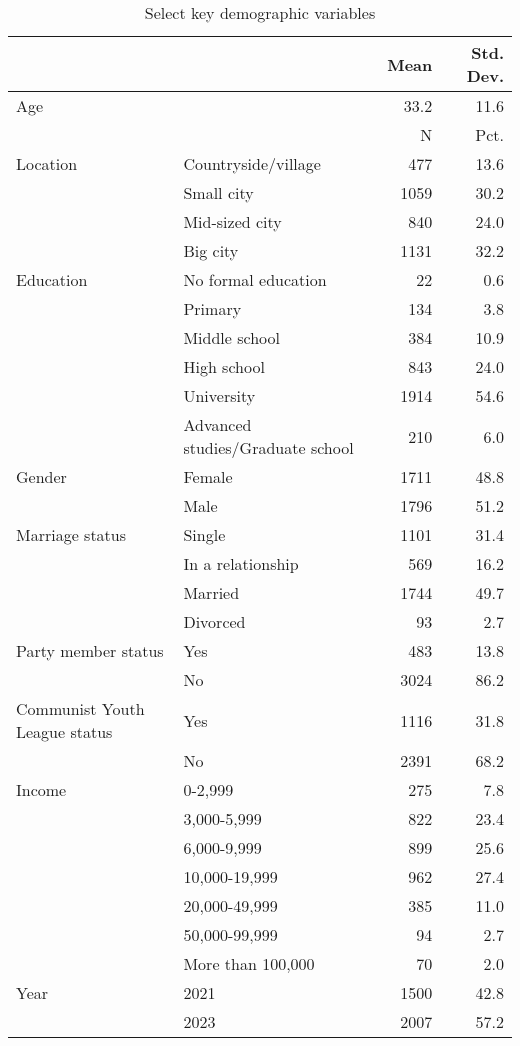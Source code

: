 \documentclass[
  letterpaper,
  DIV=11,
  numbers=noendperiod]{scrartcl}
\begin{document}
\hypertarget{tbl-demographics}{}
\begin{longtable}[t]{llrr}
\caption{\label{tbl-demographics}Select key demographic variables }\tabularnewline

\toprule
  &    & Mean & Std. Dev.\\
\midrule
Age &  & 33.2 & 11.6\\
\midrule
 &  & N & Pct.\\
Location & Countryside/village & 477 & 13.6\\
 & Small city & 1059 & 30.2\\
 & Mid-sized city & 840 & 24.0\\
 & Big city & 1131 & 32.2\\
Education & No formal education & 22 & 0.6\\
 & Primary & 134 & 3.8\\
 & Middle school & 384 & 10.9\\
 & High school & 843 & 24.0\\
 & University & 1914 & 54.6\\
 & Advanced studies/Graduate school & 210 & 6.0\\
Gender & Female & 1711 & 48.8\\
 & Male & 1796 & 51.2\\
Marriage status & Single & 1101 & 31.4\\
 & In a relationship & 569 & 16.2\\
 & Married & 1744 & 49.7\\
 & Divorced & 93 & 2.7\\
Party member status & Yes & 483 & 13.8\\
 & No & 3024 & 86.2\\
Communist Youth League status & Yes & 1116 & 31.8\\
 & No & 2391 & 68.2\\
Income & 0-2,999 & 275 & 7.8\\
 & 3,000-5,999 & 822 & 23.4\\
 & 6,000-9,999 & 899 & 25.6\\
 & 10,000-19,999 & 962 & 27.4\\
 & 20,000-49,999 & 385 & 11.0\\
 & 50,000-99,999 & 94 & 2.7\\
 & More than 100,000 & 70 & 2.0\\
Year & 2021 & 1500 & 42.8\\
 & 2023 & 2007 & 57.2\\
\bottomrule
\end{longtable}
\end{document}
